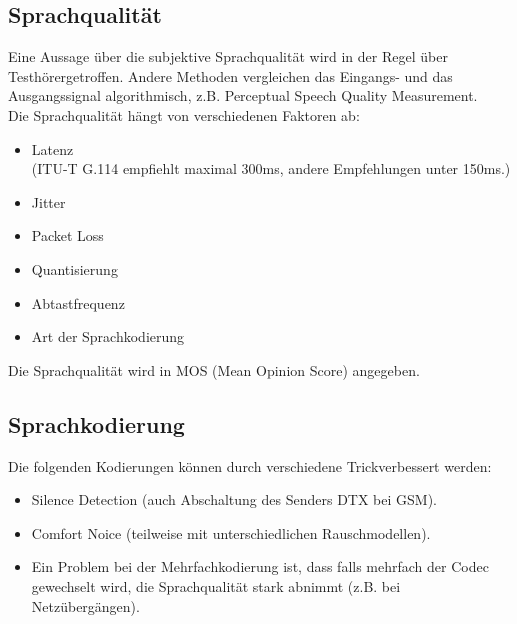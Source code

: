 \documentclass{article} %
\begin{document}
\subsection{Sprachqualität}
Eine Aussage über die subjektive Sprachqualität wird in der Regel über \glqq Testhörer\grqq getroffen. Andere Methoden vergleichen das Eingangs- und das Ausgangssignal algorithmisch, z.B. Perceptual Speech Quality Measurement.\\
Die Sprachqualität hängt von verschiedenen Faktoren ab:
\begin{itemize}
	\item Latenz\\
	(ITU-T G.114 empfiehlt maximal 300ms, andere Empfehlungen unter 150ms.)
	\item Jitter
	\item Packet Loss
	\item Quantisierung
	\item Abtastfrequenz
	\item Art der Sprachkodierung
\end{itemize}
Die Sprachqualität wird in MOS (Mean Opinion Score) angegeben.
\subsection{Sprachkodierung}
Die folgenden Kodierungen können durch verschiedene \glqq Trick\grqq verbessert werden:
\begin{itemize}
	\item Silence Detection (auch Abschaltung des Senders DTX bei GSM).
	\item Comfort Noice (teilweise mit unterschiedlichen Rauschmodellen).
	\item Ein Problem bei der Mehrfachkodierung ist, dass falls mehrfach der Codec gewechselt wird, die
	Sprachqualität stark abnimmt (z.B. bei Netzübergängen).
\end{itemize}
\end{document}
